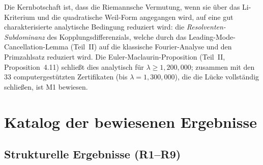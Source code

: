 \documentclass[12pt,a4paper]{article}
\theoremstyle{definition}
\theoremstyle{remark}
\begin{document}
Die Kernbotschaft ist, dass die Riemannsche Vermutung, wenn sie über das Li-Kriterium und die quadratische Weil-Form angegangen wird, auf eine gut charakterisierte analytische Bedingung reduziert wird: die \emph{Resolventen-Subdominanz} des Kopplungsdifferenzials, welche durch das Leading-Mode-Cancellation-Lemma (Teil~II) auf die klassische Fourier-Analyse und den Primzahlsatz reduziert wird. Die Euler-Maclaurin-Proposition (Teil~II, Proposition~4.11) schließt dies analytisch für $\lambda \geq 1{,}200{,}000$; zusammen mit den $33$ computergestützten Zertifikaten (bis $\lambda = 1{,}300{,}000$), die die Lücke vollständig schließen, ist M1 bewiesen.


\section{Katalog der bewiesenen Ergebnisse}
\label{sec:catalog}

\subsection{Strukturelle Ergebnisse (R1--R9)}
\end{document}
